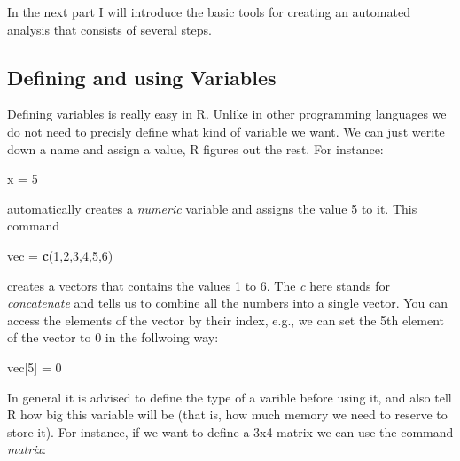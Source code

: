 \documentclass[]{article}
\newenvironment{Shaded}{\begin{snugshade}}{\end{snugshade}}
\newcommand{\DecValTok}[1]{\textcolor[rgb]{0.00,0.00,0.81}{#1}}
\newcommand{\KeywordTok}[1]{\textcolor[rgb]{0.13,0.29,0.53}{\textbf{#1}}}
\newcommand{\NormalTok}[1]{#1}
\newcommand{\StringTok}[1]{\textcolor[rgb]{0.31,0.60,0.02}{#1}}
\begin{document}
In the next part I will introduce the basic tools for creating an
automated analysis that consists of several steps.

\hypertarget{defining-and-using-variables}{%
\subsection{Defining and using
Variables}\label{defining-and-using-variables}}

Defining variables is really easy in R. Unlike in other programming
languages we do not need to precisly define what kind of variable we
want. We can just werite down a name and assign a value, R figures out
the rest. For instance:

\begin{Shaded}
\begin{Highlighting}[]
\NormalTok{x =}\StringTok{ }\DecValTok{5}
\end{Highlighting}
\end{Shaded}

automatically creates a \emph{numeric} variable and assigns the value 5
to it. This command

\begin{Shaded}
\begin{Highlighting}[]
\NormalTok{vec =}\StringTok{ }\KeywordTok{c}\NormalTok{(}\DecValTok{1}\NormalTok{,}\DecValTok{2}\NormalTok{,}\DecValTok{3}\NormalTok{,}\DecValTok{4}\NormalTok{,}\DecValTok{5}\NormalTok{,}\DecValTok{6}\NormalTok{)}
\end{Highlighting}
\end{Shaded}

creates a vectors that contains the values 1 to 6. The \emph{c} here
stands for \emph{concatenate} and tells us to combine all the numbers
into a single vector. You can access the elements of the vector by their
index, e.g., we can set the 5th element of the vector to 0 in the
follwoing way:

\begin{Shaded}
\begin{Highlighting}[]
\NormalTok{vec[}\DecValTok{5}\NormalTok{] =}\StringTok{ }\DecValTok{0} 
\end{Highlighting}
\end{Shaded}

In general it is advised to define the type of a varible before using
it, and also tell R how big this variable will be (that is, how much
memory we need to reserve to store it). For instance, if we want to
define a 3x4 matrix we can use the command \emph{matrix}:
\end{document}
